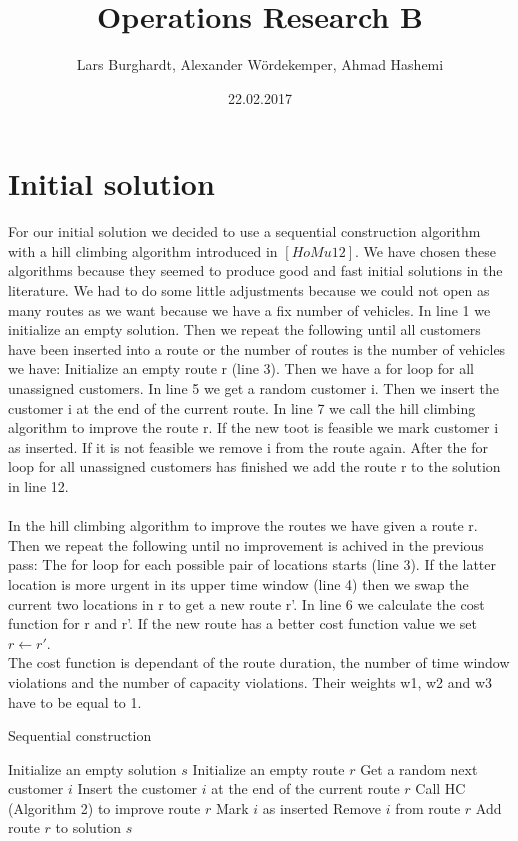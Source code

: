 \documentclass[fleqn]{scrartcl}
\title{Operations Research B}
\author{Lars Burghardt, Alexander Wördekemper, Ahmad Hashemi}
\date{22.02.2017}
\begin{document}
\maketitle
\tableofcontents
\section{Initial solution}

For our initial solution we decided to use a sequential construction algorithm with a hill climbing algorithm introduced in $[HoMu 12]$. We have chosen these algorithms because they seemed to produce good and fast initial solutions in the literature. We had to do some little adjustments because we could not open as many routes as we want because we have a fix number of vehicles. In line 1 we initialize an empty solution. Then we repeat the following until all customers have been inserted into a route or the number of routes is the number of vehicles we have: Initialize an empty route r (line 3). Then we have a for loop for all unassigned customers. In line 5 we get a random customer i. Then we insert the customer i at the end of the current route. In line 7 we call the hill climbing algorithm to improve the route r. If the new toot is feasible we mark customer i as inserted. If it is not feasible we remove i from the route again. After the for loop for all unassigned customers has finished we add the route r to the solution in line 12.
\\
\\  
In the hill climbing algorithm to improve the routes we have given a route r. Then we repeat the following until no improvement is achived in the previous pass: The for loop for each possible pair of locations starts (line 3). If the latter location is more urgent in its upper time window (line 4) then we swap the current two locations in r to get a new route r'. In line 6 we calculate the cost function for r and r'. If the new route has a better cost function value we set $r\gets r'$.\\
The cost function is dependant of the route duration, the number of time window violations and the number of capacity violations. Their weights w1, w2 and w3 have to be equal to 1.

\begin{algorithm}
\caption{Sequential construction}
\label{sequential}
\begin{algorithmic}[1]
\State Initialize an empty solution $s$
\Repeat
\State Initialize an empty route $r$
\State Get a random next customer $i$
\State Insert the customer $i$ at the end of the current route $r$
\State Call HC (Algorithm 2) to improve route $r$
\State Mark $i$ as inserted
\Else
\State Remove $i$ from route $r$
\EndIf
\EndFor
\State Add route $r$ to solution $s$
\end{algorithmic}
\end{algorithm}
\end{document}

